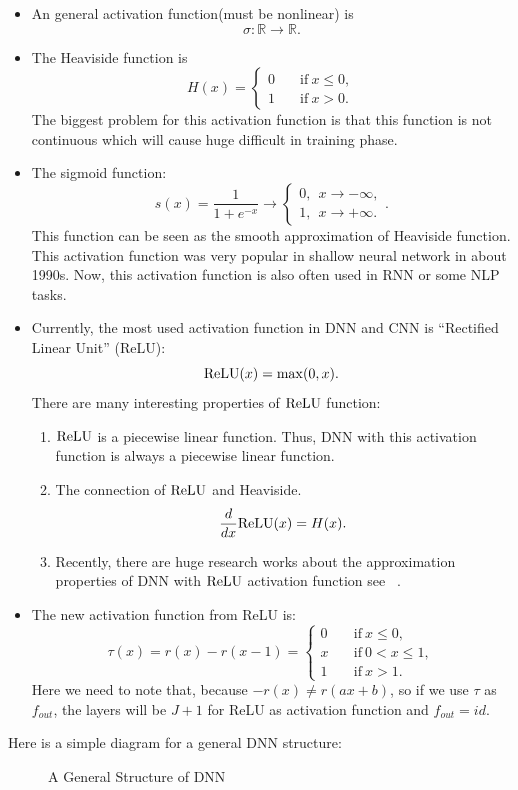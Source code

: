         \begin{itemize}
	\item An general activation function(must be nonlinear) is 
$$\sigma: \mathbb{R} \to  \mathbb{R}.$$

\item The Heaviside function is 
$$
H(x ) = \begin{cases}
0 \quad &\text{if} ~ x \le 0, \\
1 \quad &\text{if} ~ x > 0.
\end{cases}
$$
The biggest problem for this activation function is that this function is not continuous which will cause 
huge difficult in training phase.

\item The sigmoid function:
$$s(x) = \frac{1}{1 + e^{-x}}
\rightarrow 
\begin{cases}
0,~~x\rightarrow -\infty,\\
1,~~x\rightarrow +\infty.
\end{cases}
.
$$
This function can be seen as the smooth approximation of Heaviside function.
This activation function was very popular in shallow neural network in about 1990s. Now, this
activation function is also often used in RNN or some NLP tasks.


\item Currently, the most used activation function in DNN  and CNN is ``Rectified Linear Unit'' (ReLU):
$$
{\rm ReLU}(x) = \max(0, x).
$$
There are many interesting properties of ${\rm ReLU}$ function:
\begin{enumerate}
	\item ${\rm ReLU}$ is a piecewise linear function. Thus, DNN with this activation 
	function is always a piecewise linear function.
	
	\item The connection of ${\rm ReLU}$ and Heaviside.
	\begin{equation}
	\frac{d}{dx} {\rm ReLU}(x) = H(x).
	\end{equation}
	
	\item Recently, there are huge research works about the approximation properties of DNN
	with ${\rm ReLU}$ activation function see ~\cite{he2018relu,wang2018exponential,yarotsky2017error}.
\end{enumerate}
	
	\item The new activation function from ReLU is:
	$$
	\tau(x) = r(x) - r(x-1) = \begin{cases}
	0 \quad &\text{if} ~ x \le 0, \\
	x \quad &\text{if} ~  0 < x \le 1, \\
	1  \quad &\text{if} ~ x > 1.
	\end{cases}
	$$
        Here we need to note that, because $-r(x) \neq r(ax + b)$, so
        if we use $\tau$ as $f_{out}$, the layers will be $J+1$ for
        ReLU as activation function and $f_{out} = id$.
	\end{itemize}

Here is a simple diagram for a general DNN structure:
\begin{figure}[!h]
	\caption{A General Structure of DNN}
\end{figure}

